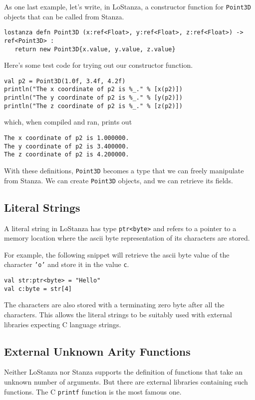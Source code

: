 \documentclass[10pt,oneside]{book}
\begin{document}
As one last example, let's write, in LoStanza, a constructor function for \texttt{\frenchspacing Point3D} objects that can be called from Stanza.
\begin{lstlisting}
lostanza defn Point3D (x:ref<Float>, y:ref<Float>, z:ref<Float>) -> ref<Point3D> :
   return new Point3D{x.value, y.value, z.value}
\end{lstlisting}

Here's some test code for trying out our constructor function.
\begin{lstlisting}
val p2 = Point3D(1.0f, 3.4f, 4.2f)
println("The x coordinate of p2 is %_." % [x(p2)])
println("The y coordinate of p2 is %_." % [y(p2)])
println("The z coordinate of p2 is %_." % [z(p2)])
\end{lstlisting}
which, when compiled and ran, prints out
\begin{lstlisting}
The x coordinate of p2 is 1.000000.
The y coordinate of p2 is 3.400000.
The z coordinate of p2 is 4.200000.
\end{lstlisting}

With these definitions, \texttt{\frenchspacing Point3D} becomes a type that we can freely manipulate from Stanza. We can create \texttt{\frenchspacing Point3D} objects, and we can retrieve its fields.  

\subsection*{Literal Strings}
A literal string in LoStanza has type \texttt{\frenchspacing ptr<byte>} and refers to a pointer to a memory location where the ascii byte representation of its characters are stored. 

For example, the following snippet will retrieve the ascii byte value of the character \texttt{\frenchspacing 'o'} and store it in the value \texttt{\frenchspacing c}.
\begin{lstlisting}
val str:ptr<byte> = "Hello"
val c:byte = str[4]
\end{lstlisting}

The characters are also stored with a terminating zero byte after all the characters. This allows the literal strings to be suitably used with external libraries expecting C language strings.

\subsection*{External Unknown Arity Functions}
Neither LoStanza nor Stanza supports the definition of functions that take an unknown number of arguments. But there are external libraries containing such functions. The C \texttt{\frenchspacing printf} function is the most famous one.
\end{document}
